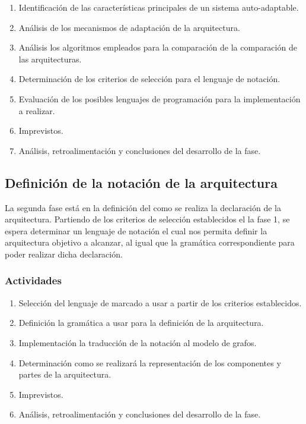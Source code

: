 \documentclass[12pt]{article}
\begin{document}
    \begin{enumerate}[label=\thesubsection.\arabic*., wide, labelindent=2em, leftmargin=5em]
        \item Identificación de las características principales de un sistema auto-adaptable.
        \item Análisis de los mecanismos de adaptación de la arquitectura.
        \item Análisis los algoritmos empleados para la comparación de la comparación de las arquitecturas.
        \item Determinación de los criterios de selección para el lenguaje de notación.
        \item Evaluación de los posibles lenguajes de programación para la implementación a realizar.
        \item Imprevistos.
        \item Análisis, retroalimentación y conclusiones del desarrollo de la fase. 
    \end{enumerate} 

    \subsection{Definición de la notación de la arquitectura}
    
    La segunda fase está en la definición del como se realiza la declaración de la arquitectura. Partiendo de los criterios de selección establecidos el la fase 1, se espera determinar un lenguaje de notación el cual nos permita definir la arquitectura objetivo a alcanzar, al igual que la gramática correspondiente para poder realizar dicha declaración. 
    
    \subsubsection*{Actividades}

    \begin{enumerate}[label=\thesubsection.\arabic*., wide, labelindent=2em, leftmargin=5em]
        \item Selección del lenguaje de marcado a usar a partir de los criterios establecidos.
        \item Definición la gramática a usar para la definición de la arquitectura.
        \item Implementación la traducción de la notación al modelo de grafos. %
        \item Determinación como se realizará la representación de los componentes y partes de la arquitectura.
        \item Imprevistos.
        \item Análisis, retroalimentación y conclusiones del desarrollo de la fase. 
    \end{enumerate}    
\end{document}
